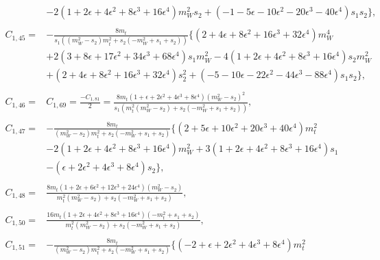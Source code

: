 \documentclass[twocolumn,aps,showpacs,nofootinbib,superscriptaddress,prd]{revtex4-2}
\begin{document}
\begin{widetext}
\begin{align}
\nonumber\\&
-2\left(1 +2 \epsilon +4 \epsilon^2 +8 \epsilon^3 +16 \epsilon^4\right)m_W^2s_2+\left(-1 -5 \epsilon -10 \epsilon^2 -20 \epsilon^3 -40 \epsilon^4\right)s_1s_2\}
,\nonumber\\
\nonumber\\
C_{1,45}=&-\frac{8m_t}{s_1\left(\left(m_W^2-s_2\right)m_t^2+s_2\left(-m_W^2+s_1+s_2\right)\right)}\{\left(2 +4 \epsilon +8 \epsilon^2 +16 \epsilon^3 +32 \epsilon^4\right)m_W^4
\nonumber\\&
+2\left(3 +8 \epsilon +17 \epsilon^2 +34 \epsilon^3 +68 \epsilon^4\right)s_1m_W^2-4\left(1 +2 \epsilon +4 \epsilon^2 +8 \epsilon^3 +16 \epsilon^4\right)s_2m_W^2
\nonumber\\&
+\left(2 +4 \epsilon +8 \epsilon^2 +16 \epsilon^3 +32 \epsilon^4\right)s_2^2+\left(-5 -10 \epsilon -22 \epsilon^2 -44 \epsilon^3 -88 \epsilon^4\right)s_1s_2\}
,\nonumber\\
\nonumber\\
C_{1,46}=&C_{1,69}=\frac{-C_{1,81}}{2}=\frac{8m_t\left(1 +\epsilon +2 \epsilon^2 +4 \epsilon^3 +8 \epsilon^4\right)\left(m_W^2-s_2\right)^2}{s_1\left(m_t^2
\left(m_W^2-s_2\right)+s_2\left(-m_W^2+s_1+s_2\right)\right)}
,\nonumber\\
\nonumber\\
C_{1,47}=&-\frac{8m_t}{\left(m_W^2-s_2\right)m_t^2+s_2\left(-m_W^2+s_1+s_2\right)}\{\left(2 +5 \epsilon +10 \epsilon^2 +20 \epsilon^3 +40 \epsilon^4\right)m_t^2
\nonumber\\&
-2\left(1 +2 \epsilon +4 \epsilon^2 +8 \epsilon^3 +16 \epsilon^4\right)m_W^2+3\left(1 +2 \epsilon +4 \epsilon^2 +8 \epsilon^3 +16 \epsilon^4\right)s_1
\nonumber\\&
-\left(\epsilon +2 \epsilon^2 +4 \epsilon^3 +8 \epsilon^4\right)s_2\}
,\nonumber\\
\nonumber\\
C_{1,48}=&\frac{8m_t\left(1 +2 \epsilon +6 \epsilon^2 +12 \epsilon^3 +24 \epsilon^4\right)\left(m_W^2-s_2\right)}{m_t^2
\left(m_W^2-s_2\right)+s_2\left(-m_W^2+s_1+s_2\right)}
,\nonumber\\
\nonumber\\
C_{1,50}=&\frac{16m_t\left(1 +2 \epsilon +4 \epsilon^2 +8 \epsilon^3 +16 \epsilon^4\right)\left(-m_t^2+s_1+s_2\right)}{m_t^2
\left(m_W^2-s_2\right)+s_2\left(-m_W^2+s_1+s_2\right)}
,\nonumber\\
\nonumber\\
C_{1,51}=&-\frac{8m_t}{\left(m_W^2-s_2\right)m_t^2+s_2\left(-m_W^2+s_1+s_2\right)}\{\left(-2 +\epsilon +2 \epsilon^2 +4 \epsilon^3 +8 \epsilon^4\right)m_t^2

\end{align}
\end{widetext}
\end{document}
